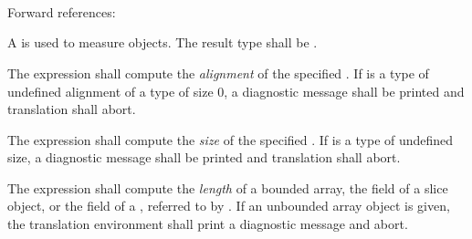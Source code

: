 \begin{grammar}
 \\
	 \\
	 \\
	 \\
	 \\

 \\
	 \terminal{(}  \terminal{)} \\

 \\
	 \terminal{(}  \terminal{)} \\

 \\
	 \terminal{(}  \terminal{)} \\

 \\
	 \terminal{(}  \terminal{)} \\
\end{grammar}

Forward references: 

\specsubsubitem
A  is used to measure objects. The result
type shall be .

\specsubsubitem
The  expression shall compute the \textit{alignment} of the specified
. If  is a type of undefined alignment of a
type of size 0, a diagnostic message shall be printed and translation shall
abort.

\specsubsubitem
The  expression shall compute the \textit{size} of the specified
. If  is a type of undefined size, a
diagnostic message shall be printed and translation shall abort.

\specsubsubitem
The  expression shall compute the \textit{length} of a bounded
array, the  field of a slice object, or the  field of
a , referred to by . If an unbounded array
object is given, the translation environment shall print a diagnostic message
and abort.

